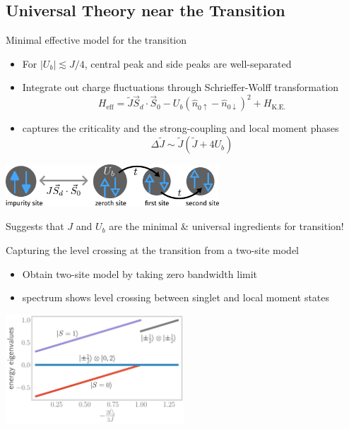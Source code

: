 \documentclass[8pt,aspectratio=169]{beamer}
\newcommand{\nitem}{\item[\ding{51}]}
\begin{document}
\begin{frame}{}
\section{Universal Theory near the Transition}
\end{frame}
\begin{frame}{Minimal effective model for the transition}
\centering
\begin{itemize}
	\nitem For \(|U_b| \lesssim J/4\), central peak and side peaks are \alert{well-separated} \\[10pt]
	\nitem \alert{Integrate out} charge fluctuations through Schrieffer-Wolff transformation
\[H_\text{eff} = \tilde J \vec{S}_d\cdot\vec{S}_0 - U_b\left(\hat n_{0 \uparrow} - \hat n_{0 \downarrow}\right)^2 + H_\text{K.E.}\]
\nitem \alert{captures} the criticality and the strong-coupling and local moment phases
\[ \Delta \tilde J \sim \tilde J \left( \tilde J  + 4U_b \right) \]
\end{itemize}

\includegraphics[width=0.6\textwidth]{universal-theory.pdf}

\vspace*{\fill}

Suggests that \alert{$J$ and $U_b$ are the minimal \& universal ingredients} for transition!

\end{frame}

\begin{frame}{Capturing the level crossing at the transition from a two-site model}

\begin{itemize}
	\nitem Obtain two-site model by taking \alert{zero bandwidth} limit\\[10pt]
	\nitem spectrum shows \alert{level crossing} between singlet and local moment states
\end{itemize}

\vspace*{\fill}

\includegraphics[width=0.5\textwidth]{twosite_spectrum.pdf}
\end{frame}
\end{document}
